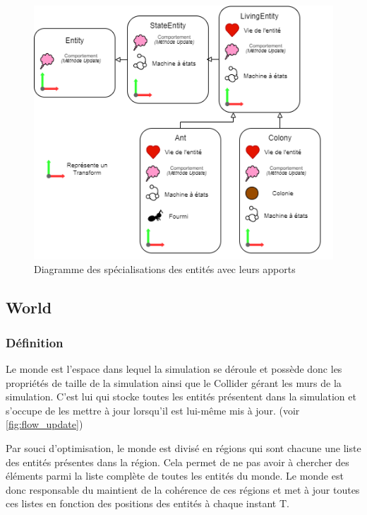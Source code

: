 \documentclass{EPUProjetDi}
\begin{document}
\begin{figure}[h]
    \centering
    \includegraphics[scale=0.5]{entities_specialisations.png}
    \caption{Diagramme des spécialisations des entités avec leurs apports}
    \label{fig:struct_entities_spec}
\end{figure}

\subsection{World}

\subsubsection*{Définition}

Le monde est l'espace dans lequel la simulation se déroule et possède donc les propriétés de taille de la simulation ainsi que le Collider
gérant les murs de la simulation.
C'est lui qui stocke toutes les entités présentent dans la simulation et s'occupe de les mettre à jour lorsqu'il est lui-même mis à jour. 
(voir \autoref{fig:flow_update})

Par souci d'optimisation, le monde est divisé en régions qui sont chacune une liste des entités présentes dans la région. 
Cela permet de ne pas avoir à chercher des éléments parmi la liste complète de toutes les entités du monde.
Le monde est donc responsable du maintient de la cohérence de ces régions et met à jour toutes ces listes en fonction des positions
des entités à chaque instant T.
\end{document}
